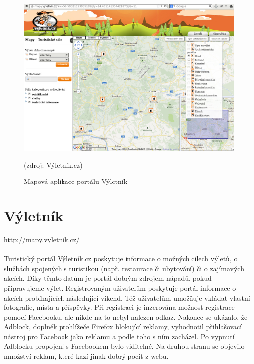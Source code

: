 \documentclass[11pt,a4paper,titlepage,oneside]{book}
\begin{document}
		\begin{figure}[!h]
			\begin{center}
				\includegraphics[width=12cm]{obrazky/vyletnik.png}
				\caption{Mapová aplikace portálu Výletník}
				(zdroj: Výletník.cz\cite{vyletnikMapa})
			\end{center}
		\end{figure}

	\section{Výletník}
		\label{sec:vyletnik}
		\url{http://mapy.vyletnik.cz/}
		\paragraph{} Turistický portál Výletník.cz poskytuje informace o možných cílech výletů, o službách spojených s turistikou (např. restaurace či ubytování)  či o zají\-mavých akcích. Díky těmto datům je portál dobrým zdrojem nápadů, pokud připravujeme výlet. Registrovaným uživatelům poskytuje portál informace o akcích probíhajících následující víkend. Též uživatelům umožňuje vkládat vlastní fotografie, místa a příspěvky. Při registraci je inzerována možnost registrace pomocí Facebooku, ale nikde na to nebyl nalezen odkaz. Nakonec se ukázalo, že Adblock, doplněk prohlížeče Firefox blokující reklamy, vyhodnotil přihlašovací nástroj pro Facebook jako reklamu a podle toho s ním zacházel. Po vypnutí Adblocku propojení s Facebookem bylo viditelné. Na druhou stranu se objevilo množství reklam, které kazí jinak dobrý pocit z webu.
\end{document}
